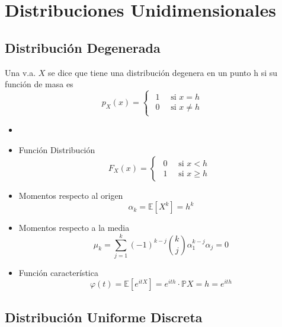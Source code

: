 \chapter{Distribuciones Unidimensionales}

\section{Distribución Degenerada}

\begin{defn}
  Una v.a. $X$ se dice que tiene una distribución degenera en un punto h si su función de masa es
  \[ 
    p_{X}(x) =
    \begin{cases}
      \begin{aligned}
        1 \quad \text{ si } x = h \\
        0 \quad \text{ si } x \neq h
      \end{aligned}
    \end{cases}
  \] 
\end{defn}

\begin{prop}
  \begin{itemize}
    \item []
    \item Función Distribución 
      \[ 
        F_{X}(x) =
        \begin{cases}
          \begin{aligned}
            0 \quad \text{ si } x < h \\
            1 \quad \text{ si } x \geq h
          \end{aligned}
        \end{cases} 
      \] 
    \item Momentos respecto al origen
      \[ 
        \alpha_{k} = \mathbb{E} [ X^{k} ] = h^{k}
      \] 
    \item Momentos respecto a la media
      \[ 
        \mu_{k}  = \sum_{j = 1}^{k} (-1)^{k - j} \binom{k}{j} \alpha^{k - j}_{1} \alpha_{j} = 0
      \] 
    \item Función característica
      \[ 
        \varphi(t) = \mathbb{E} [ e^{itX} ] = e^{ith} \cdot \mathbb{P} { X = h } = e^{ith} 
      \] 
  \end{itemize}
\end{prop}

\section{Distribución Uniforme Discreta}


